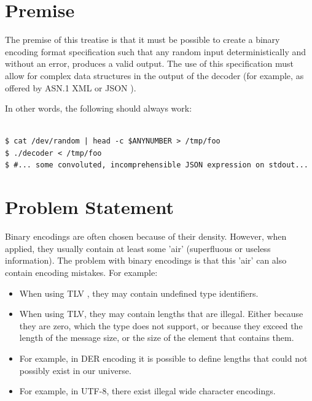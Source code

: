 \section{Premise}

The premise of this treatise is that it must be possible to create
a binary encoding format specification such that any random input 
deterministically and without an error, produces a valid output.
The use of this specification must allow for complex data structures
in the output of the decoder (for example, as offered by ASN.1 \cite{bib:asn1}
  XML \cite{bib:xml} or JSON \cite{bib:json}).

In other words, the following should always work:

\begin{changemargin}{-60mm}{0mm}
\begin{myquote}
\begin{verbatim}

$ cat /dev/random | head -c $ANYNUMBER > /tmp/foo
$ ./decoder < /tmp/foo
$ #... some convoluted, incomprehensible JSON expression on stdout...

\end{verbatim}
\end{myquote}
\end{changemargin}

\section{Problem Statement}

Binary encodings are often chosen because of their density.
However, when applied, they usually contain at least some 'air'
(superfluous or useless information).
The problem with binary encodings is that this 'air' can also contain
encoding mistakes. For example:

\begin{itemize}
\item When using TLV \cite{bib:tlv}, they may contain undefined type identifiers.
\item When using TLV, they may contain lengths that are illegal.
  Either because they are zero, which the type does not support,
  or because they exceed the length of the message size, or
  the size of the element that contains them.
\item For example, in DER \cite{bib:ber} encoding it is possible to define lengths
  that could not possibly exist in our universe.
\item For example, in UTF-8, there exist illegal wide character encodings.
\end{itemize}

